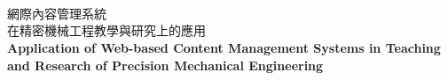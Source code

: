 \documentclass[14pt,a4paper]{report}  %
\begin{document}
\begin{titlepage}
\begin{center}
\\[15pt] %
\\[15pt]
\\[120pt]
{\fontsize{24pt}{2.5pt}網際內容管理系統}\\
{\fontsize{24pt}{2.5pt}在精密機械工程教學與研究上的應用}\\[50pt]
{\fontsize{18pt}{2.5pt}\bf Application of Web-based Content Management Systems in Teaching and Research of Precision Mechanical Engineering}
\end{center}
\begin{flushleft}
\begin{LARGE}
\vspace{5em}
\hspace{32mm}\\[6pt]
\hspace{32mm}\\[6pt]
\hspace{32mm}\\[6pt]
\hspace{32mm}\\[6pt]
\hspace{32mm}\makebox[5cm][s]

\end{LARGE}
\end{flushleft}
\end{titlepage}
\end{document}
